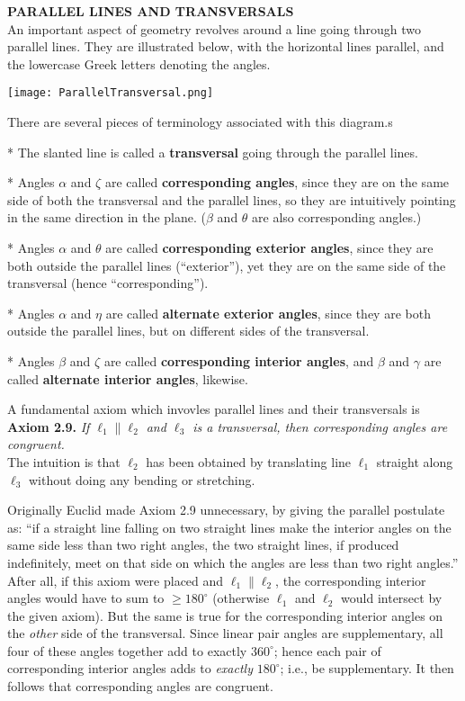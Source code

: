 \documentclass[leqno]{book}
\begin{document}
\noindent\textbf{PARALLEL LINES AND TRANSVERSALS}\\

\noindent An important aspect of geometry revolves around a line going through two parallel lines.  They are illustrated below, with the horizontal lines parallel, and the lowercase Greek letters denoting the angles.
\begin{center}\texttt{[image: ParallelTransversal.png]}\end{center}
There are several pieces of terminology associated with this diagram.s

* The slanted line is called a \textbf{transversal} going through the parallel lines.

* Angles $\alpha$ and $\zeta$ are called \textbf{corresponding angles}, since they are on the same side of both the transversal and the parallel lines, so they are intuitively pointing in the same direction in the plane.  ($\beta$ and $\theta$ are also corresponding angles.)

* Angles $\alpha$ and $\theta$ are called \textbf{corresponding exterior angles}, since they are both outside the parallel lines (``exterior''), yet they are on the same side of the transversal (hence ``corresponding'').

* Angles $\alpha$ and $\eta$ are called \textbf{alternate exterior angles}, since they are both outside the parallel lines, but on different sides of the transversal.

* Angles $\beta$ and $\zeta$ are called \textbf{corresponding interior angles}, and $\beta$ and $\gamma$ are called \textbf{alternate interior angles}, likewise.

A fundamental axiom which invovles parallel lines and their transversals is\\

\noindent\textbf{Axiom 2.9.} \emph{If $\ell_1\parallel\ell_2$ and $\ell_3$ is a transversal, then corresponding angles are congruent.}\\

\noindent The intuition is that $\ell_2$ has been obtained by translating line $\ell_1$ straight along $\ell_3$ without doing any bending or stretching.

Originally Euclid made Axiom 2.9 unnecessary, by giving the parallel postulate as: ``if a straight line falling on two straight lines make the interior angles on the same side less than two right angles, the two straight lines, if produced indefinitely, meet on that side on which the angles are less than two right angles.''  After all, if this axiom were placed and $\ell_1\parallel\ell_2$, the corresponding interior angles would have to sum to $\geqslant 180^\circ$ (otherwise $\ell_1$ and $\ell_2$ would intersect by the given axiom).  But the same is true for the corresponding interior angles on the \emph{other} side of the transversal.  Since linear pair angles are supplementary, all four of these angles together add to exactly $360^\circ$; hence each pair of corresponding interior angles adds to \emph{exactly} $180^\circ$; i.e., be supplementary.  It then follows that corresponding angles are congruent.
\end{document}
